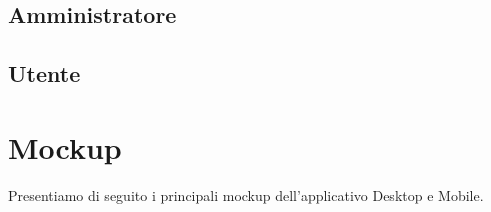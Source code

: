 \subsection{Amministratore}


\pagebreak



\pagebreak

\subsection{Utente}







\pagebreak
\section{Mockup}
Presentiamo di seguito i principali mockup dell'applicativo Desktop e Mobile.
